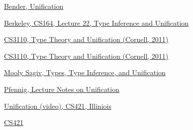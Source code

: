 \begin{thebibliography}

 \href{https://www.cs.unh.edu/~ruml/cs730/unification.pdf}{Bender, Unification}

 \href{https://inst.eecs.berkeley.edu/~cs164/sp11/lectures/lecture22.pdf}{Berkeley, CS164, Lecture 22, Type Inference and Unification} $\quad$ 

 \href{https://www.cs.cornell.edu/courses/cs3110/2011sp/Lectures/lec26-type-inference/type-inference.htm}{CS3110, Type Theory and Unification (Cornell, 2011)} $\quad$ 

 \href{https://www.cs.cornell.edu/courses/cs6110/2017sp/lectures/lec23.pdf}{CS3110, Type Theory and Unification (Cornell, 2011)} 

 \href{http://www.cs.tau.ac.il/~msagiv/courses/pl16/types.pdf}{Mooly Sagiv, Types, Type Inference, and Unification} $\quad$ 

 \href{https://www.cs.cmu.edu/~fp/courses/15816-s12/lectures/19-unif.pdf}{Pfennig, Lecture Notes on Unification}

 \href{https://pages.github-dev.cs.illinois.edu/cs421-sp18/web/videos/unification/}{Unification (video), CS421, Illiniois}

 \href{https://pages.github-dev.cs.illinois.edu/cs421-sp18/web/pages/lectures/}{CS421}

\end{thebibliography}